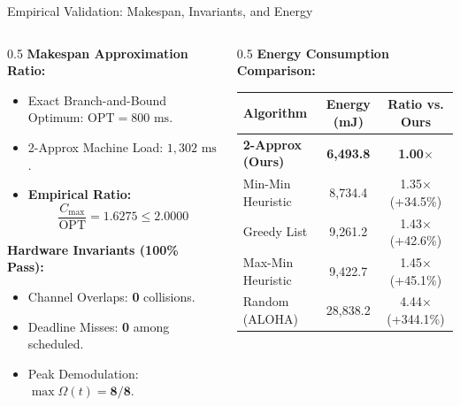 \documentclass[aspectratio=169,10pt]{beamer}
\begin{document}
\begin{frame}{Empirical Validation: Makespan, Invariants, and Energy}
  \begin{columns}[T]
    \begin{column}{0.5\textwidth}
      \textbf{Makespan Approximation Ratio:}
      \begin{itemize}
        \item Exact Branch-and-Bound Optimum: $\text{OPT} = 800\text{ ms}$.
        \item 2-Approx Machine Load: $1{,}302\text{ ms}$.
        \item \textbf{Empirical Ratio:}
        $$\frac{C_{\max}}{\text{OPT}} = \mathbf{1.6275} \le \mathbf{2.0000}$$
      \end{itemize}
      \textbf{Hardware Invariants (100\% Pass):}
      \begin{itemize}
        \item Channel Overlaps: \textbf{0} collisions.
        \item Deadline Misses: \textbf{0} among scheduled.
        \item Peak Demodulation: $\max \Omega(t) = \mathbf{8/8}$.
      \end{itemize}
    \end{column}
    \begin{column}{0.5\textwidth}
      \textbf{Energy Consumption Comparison:}
      \begin{table}[h]
        \centering
        \scriptsize
        \begin{tabular}{lcc}
          \toprule
          \textbf{Algorithm} & \textbf{Energy (mJ)} & \textbf{Ratio vs. Ours} \\
          \midrule
          \textbf{2-Approx (Ours)} & \textbf{6,493.8} & \textbf{1.00$\times$} \\
          Min-Min Heuristic & 8,734.4 & 1.35$\times$ (+34.5\%) \\
          Greedy List & 9,261.2 & 1.43$\times$ (+42.6\%) \\
          Max-Min Heuristic & 9,422.7 & 1.45$\times$ (+45.1\%) \\
          Random (ALOHA) & 28,838.2 & 4.44$\times$ (+344.1\%) \\
          \bottomrule
        \end{tabular}
      \end{table}
    \end{column}
  \end{columns}
\end{frame}
\end{document}
